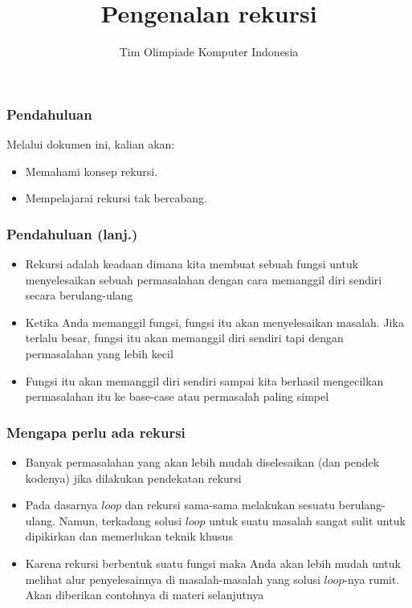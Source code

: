 

\title{Pengenalan rekursi}
\author{Tim Olimpiade Komputer Indonesia}
\date{}



\begin{frame}
\titlepage
\end{frame}

\begin{frame}
\frametitle{Pendahuluan}
Melalui dokumen ini, kalian akan:
\begin{itemize}
  \item Memahami konsep rekursi.
  \item Mempelajarai rekursi tak bercabang.
\end{itemize}
\end{frame}

\begin{frame}
\frametitle{Pendahuluan (lanj.) }
\begin{itemize}
  \item Rekursi adalah keadaan dimana kita membuat sebuah fungsi untuk menyelesaikan sebuah permasalahan dengan cara memanggil diri sendiri secara berulang-ulang
  \item Ketika Anda memanggil fungsi, fungsi itu akan menyelesaikan masalah. Jika terlalu besar, fungsi itu akan memanggil diri sendiri tapi dengan permasalahan yang lebih kecil
  \item Fungsi itu akan memanggil diri sendiri sampai kita berhasil mengecilkan permasalahan itu ke base-case atau permasalah paling simpel
\end{itemize}
\end{frame}

\begin{frame}
\frametitle{Mengapa perlu ada rekursi }
\begin{itemize}
  \item Banyak permasalahan yang akan lebih mudah diselesaikan (dan pendek kodenya) jika dilakukan pendekatan rekursi
  \item Pada dasarnya $loop$ dan rekursi sama-sama melakukan sesuatu berulang-ulang. Namun, terkadang solusi $loop$ untuk suatu masalah sangat sulit untuk dipikirkan dan memerlukan teknik khusus
  \item Karena rekursi berbentuk suatu fungsi maka Anda akan lebih mudah untuk melihat alur penyelesainnya di masalah-masalah yang solusi $loop$-nya rumit. Akan diberikan contohnya di materi selanjutnya
\end{itemize}
\end{frame}

